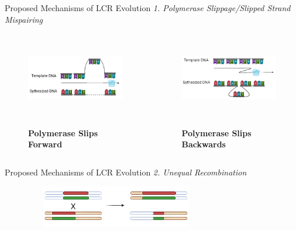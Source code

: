 \documentclass{beamer}
\begin{document}
	\begin{frame}{Proposed Mechanisms of LCR Evolution}
		\textit{1. Polymerase Slippage/Slipped Strand Mispairing}
		\begin{columns}
			
			\centering
			\begin{figure}
				\includegraphics[width=\columnwidth, height=2.5cm]{slippage2.png} \\~\\
				\caption{\centering \textbf{Polymerase Slips Forward}}
			\end{figure}
			
			\centering
			\begin{figure}
				\includegraphics[width=\columnwidth, height=2.5cm]{slippage1.png} \\~\\
				\caption{\centering \textbf{Polymerase Slips Backwards}}
			\end{figure}
		
		\end{columns}
	
	\end{frame}

	\begin{frame}{Proposed Mechanisms of LCR Evolution}
		\textit{2. Unequal Recombination} \newline\newline
		
		\begin{figure}
			\includegraphics[width=8cm, height=1.8cm]{unequal.png} \\~\\
		\end{figure}
		
	\end{frame}
	
\end{document}
